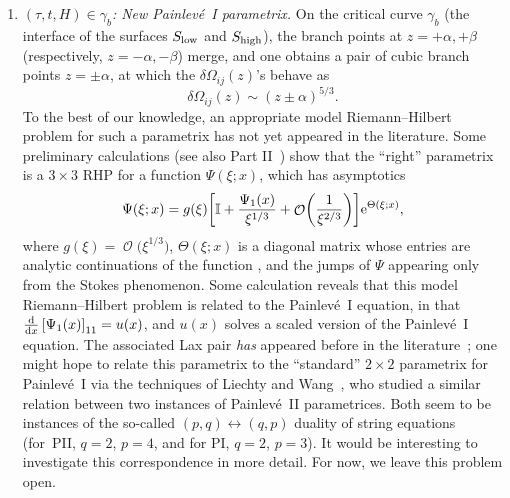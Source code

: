 \documentclass[10pt,a4paper]{amsart}
\DeclareMathOperator{\OO}{\mathcal{O}}
\numberwithin{equation}{section}
\begin{document}
\begin{Remark}
\begin{enumerate}
 \item[$(5)$] \textit{$(\tau,t,H)\in \gamma_b$: New Painlev\'{e}~I parametrix.}
 On the critical curve $\gamma_b$ (the interface of the surfaces $S_{{\rm low}}$ and $S_{{\rm high}}$), the branch points at $z=+\alpha,+\beta$
 (respectively, $z=-\alpha,-\beta$) merge, and one obtains a pair of cubic branch points $z=\pm \alpha$, at which the $\delta\Omega_{ij}(z)$'s
 behave as
 \begin{equation*}
 \delta \Omega_{ij}(z) \sim (z\pm \alpha)^{5/3}.
 \end{equation*}
 To the best of our knowledge, an appropriate model Riemann--Hilbert problem for such a parametrix has not yet appeared in the literature. Some
 preliminary calculations (see also Part II~\cite{DHL2}) show that the ``right'' parametrix is a $3\times 3$ RHP for a function $\Psi(\xi;x)$,
 which has asymptotics
 \begin{equation*}
 \Psi(\xi;x) = g(\xi)\biggl[\mathbb{I} + \frac{\Psi_{1}(x)}{\xi^{1/3}} + \OO\biggl(\frac{1}{\xi^{2/3}}\biggr)\biggr]{\rm e}^{\Theta(\xi;x)},
 \end{equation*}
 where $g(\xi) = \OO\bigl(\xi^{1/3}\bigr)$, $\Theta(\xi;x)$ is a diagonal matrix whose entries are analytic continuations of the function , and the jumps of $\Psi$ appearing only from the Stokes phenomenon. Some calculation reveals
 that this model Riemann--Hilbert problem is related to the Painlev\'{e}~I equation, in that $\frac{\rm d}{{\rm d}x}\left[\Psi_{1}(x)\right]_{11} = u(x)$, and $u(x)$ solves a scaled version of the Painlev\'{e}~I equation. The associated Lax pair \textit{has} appeared before in the literature~\cite{JKT}; one might hope to relate this parametrix to the ``standard'' $2\times 2$ parametrix for Painlev\'{e}~I via the
 techniques of Liechty and Wang~\cite{LW}, who studied a similar relation between two instances of Painlev\'{e}~II parametrices. Both
 seem to be instances of the so-called $(p,q)\leftrightarrow (q,p)$ duality of string equations~\cite{FKN,GGPZ} (for~PII, $q=2$, $p=4$, and for PI, $q=2$, $p=3$).
 It would be interesting to investigate this correspondence in more detail. For now, we leave this problem open.


\end{enumerate}
\end{Remark}
\end{document}
